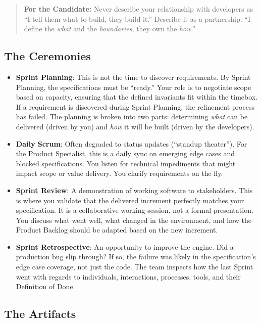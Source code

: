 \begin{quote}
\textbf{For the Candidate:} Never describe your relationship with
developers as ``I tell them what to build, they build it.'' Describe it
as a partnership: ``I define the \emph{what} and the \emph{boundaries},
they own the \emph{how}.''
\end{quote}

\subsection{The Ceremonies}\label{the-ceremonies}

\begin{itemize}
\tightlist
\item
  \textbf{Sprint Planning}: This is not the time to discover
  requirements. By Sprint Planning, the specifications must be
  ``ready.'' Your role is to negotiate scope based on capacity, ensuring
  that the defined invariants fit within the timebox. If a requirement
  is discovered during Sprint Planning, the refinement process has
  failed. The planning is broken into two parts: determining \emph{what}
  can be delivered (driven by you) and \emph{how} it will be built
  (driven by the developers).
\item
  \textbf{Daily Scrum}: Often degraded to status updates (``standup
  theater''). For the Product Specialist, this is a daily sync on
  emerging edge cases and blocked specifications. You listen for
  technical impediments that might impact scope or value delivery. You
  clarify requirements on the fly.
\item
  \textbf{Sprint Review}: A demonstration of working software to
  stakeholders. This is where you validate that the delivered increment
  perfectly matches your specification. It is a collaborative working
  session, not a formal presentation. You discuss what went well, what
  changed in the environment, and how the Product Backlog should be
  adapted based on the new increment.
\item
  \textbf{Sprint Retrospective}: An opportunity to improve the engine.
  Did a production bug slip through? If so, the failure was likely in
  the specification's edge case coverage, not just the code. The team
  inspects how the last Sprint went with regards to individuals,
  interactions, processes, tools, and their Definition of Done.
\end{itemize}

\subsection{The Artifacts}\label{the-artifacts}

